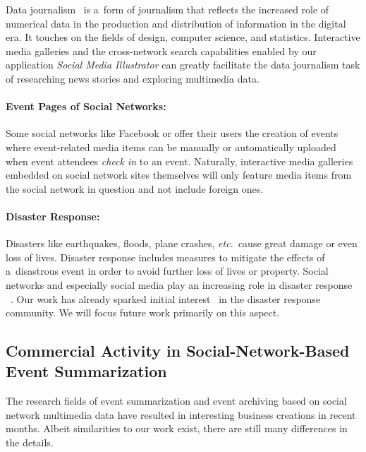 Data journalism~\cite{gray2012data}
is a~form of journalism that reflects the increased role
of numerical data in the production and distribution of information
in the digital era.
It touches on the fields of design, computer science, and statistics.
Interactive media galleries and the cross-network search capabilities enabled by our application \emph{Social Media Illustrator}
can greatly facilitate the data journalism task of researching news stories and exploring multimedia data.

\paragraph{Event Pages of Social Networks:}

Some social networks like Facebook or \googleplus
offer their users the creation of events where
event-related media items can be manually or automatically
uploaded when event attendees \emph{check in} to an event.
Naturally, interactive media galleries embedded on
social network sites themselves will only feature media items
from the social network in question and not include foreign ones.

\paragraph{Disaster Response:}

Disasters like earthquakes, floods, plane crashes, \emph{etc.}\ cause
great damage or even loss of lives.
Disaster response includes measures to
mitigate the effects of a~disastrous event
in order to avoid further loss of lives or property.
Social networks and especially social media
play an increasing role in disaster response%
~\cite{shklovski2008disasterresponse,sutton2008backchannels}.
Our work has already sparked initial interest~\cite{meier2013wikipedia}
in the disaster response community.
We will focus future work primarily on this aspect.

\subsection[Commercial Activity in Event Summarization]{Commercial Activity in Social-Network-Based Event Summarization}

The research fields of event summarization and event archiving
based on social network multimedia data have resulted in
interesting business creations in recent months.
Albeit similarities to our work exist,
there are still many differences in the details.

